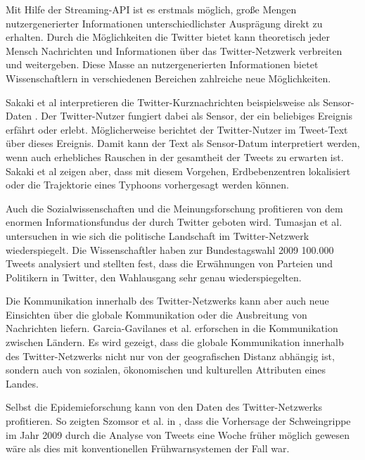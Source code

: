 		Mit Hilfe der Streaming-API ist es erstmals möglich, große Mengen nutzergenerierter Informationen unterschiedlichster Ausprägung direkt zu erhalten. 
		Durch die Möglichkeiten die Twitter bietet kann theoretisch jeder Mensch Nachrichten und Informationen über das Twitter-Netzwerk verbreiten und weitergeben. 
		Diese Masse an nutzergenerierten Informationen bietet Wissenschaftlern in verschiedenen Bereichen zahlreiche neue Möglichkeiten.

		Sakaki et al interpretieren die Twitter-Kurznachrichten beispielsweise als Sensor-Daten \cite{Sakaki2010}.
		Der Twitter-Nutzer fungiert dabei als Sensor, der ein beliebiges Ereignis erfährt oder erlebt.
		Möglicherweise berichtet der Twitter-Nutzer im Tweet-Text über dieses Ereignis. 
		Damit kann der Text als Sensor-Datum interpretiert werden, wenn auch erhebliches Rauschen in der gesamtheit der Tweets zu erwarten ist.    
		Sakaki et al zeigen aber, dass mit diesem Vorgehen, Erdbebenzentren lokalisiert oder die Trajektorie eines Typhoons vorhergesagt werden können.   
		
		Auch die Sozialwissenschaften und die Meinungsforschung profitieren von dem enormen Informationsfundus der durch Twitter geboten wird.  
		Tumasjan et al. untersuchen in \cite{Tumasjan2011} wie sich die politische Landschaft im Twitter-Netzwerk wiederspiegelt. 
		Die Wissenschaftler haben zur Bundestagswahl 2009 100.000 Tweets analysiert und stellten fest, dass die Erwähnungen von Parteien und Politikern in Twitter, den Wahlausgang sehr genau wiederspiegelten.  
		
		Die Kommunikation innerhalb des Twitter-Netzwerks kann aber auch neue Einsichten über die globale Kommunikation oder die Ausbreitung von Nachrichten liefern.
		Garcia-Gavilanes et al. erforschen in \cite{Garcia-Gavilanes2014} die Kommunikation zwischen Ländern. 
		Es wird gezeigt, dass die globale Kommunikation innerhalb des Twitter-Netzwerks nicht nur von der geografischen Distanz abhängig ist, sondern auch von sozialen, ökonomischen und kulturellen Attributen eines Landes.   

		Selbst die Epidemieforschung kann von den Daten des Twitter-Netzwerks profitieren. 
		So zeigten Szomsor et al. in \cite{Szomszor2011}, dass die Vorhersage der Schweingrippe im Jahr 2009 durch die Analyse von Tweets eine Woche früher möglich gewesen wäre als dies mit konventionellen Frühwarnsystemen der Fall war. 

